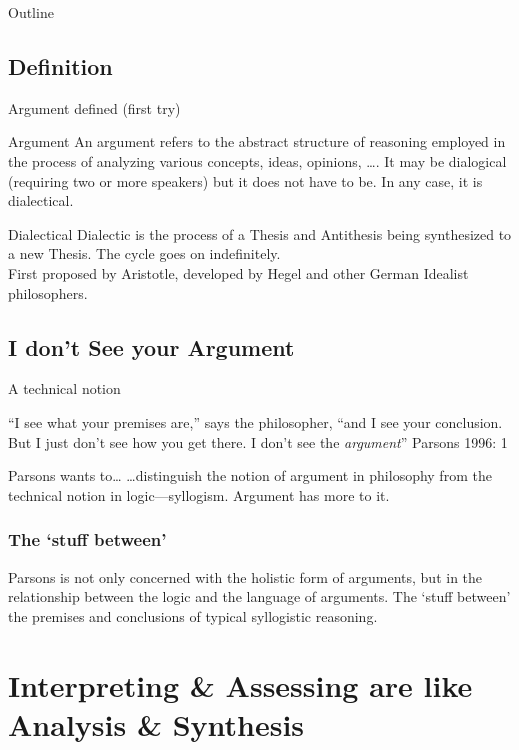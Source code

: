 \documentclass{beamer}
\begin{document}
\begin{frame}{Outline}
\subsection{Definition}
\begin{frame}{Argument defined (first try)}
\begin{exampleblock}{\sc Argument}
An argument refers to the abstract structure of reasoning employed in the process of analyzing various concepts, ideas, opinions, \ldots. It may be dialogical (requiring two or more speakers) but it does not have to be. In any case, it is dialectical.
\end{exampleblock}
\begin{block}{Dialectical}
Dialectic is the process of a Thesis and Antithesis being synthesized to a new Thesis. The cycle goes on indefinitely.\\ First proposed by Aristotle, developed by Hegel and other German Idealist philosophers.
\end{block}
 \end{frame}\label{firsttry}


 
\subsection{I don't See your Argument}
\begin{frame}{A technical notion}
\begin{block}{}
``I see what your premises are,'' says the philosopher, ``and I see your conclusion.  But I just don't see how you get there.  I don't see the \textsl{argument}'' {Parsons 1996: 1}
\end{block}
\pause
\begin{block}{Parsons wants to\dots}
\ldots distinguish the notion of argument in philosophy from the technical notion in logic---syllogism. Argument has more \color{blue}{stuff} to it.  
\end{block} 
\end{frame}

\begin{frame}\frametitle{The `stuff between'}
Parsons is not only concerned with the holistic form of arguments, but in the relationship between the logic and the language of arguments. The `stuff between' the premises and conclusions of typical syllogistic reasoning.
\end{frame}


\section{Interpreting \& Assessing are like Analysis \& Synthesis}

\end{frame}
\end{document}
